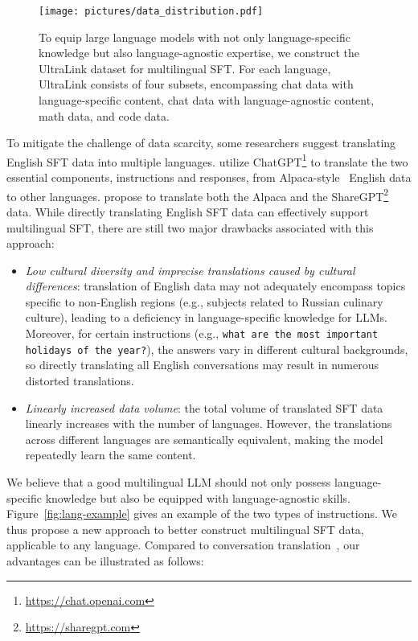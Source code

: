 \documentclass[11pt]{article}
\begin{document}
\begin{figure}[t]
    \centering
    \texttt{[image: pictures/data\_distribution.pdf]}
    \caption{To equip large language models with not only language-specific knowledge but also language-agnostic expertise, we construct the UltraLink dataset for multilingual SFT. For each language, UltraLink consists of four subsets, encompassing chat data with language-specific content, chat data with language-agnostic content, math data, and code data.}
    \label{fig:data_distribution}
\end{figure}

To mitigate the challenge of data scarcity, some researchers suggest translating English SFT data into multiple languages. \citet{okapi} utilize ChatGPT\footnote{\url{https://chat.openai.com}} to translate the two essential components, instructions and responses, from Alpaca-style~\cite{alpaca} English data to other languages. \citet{phoenix} propose to translate both the Alpaca and the ShareGPT\footnote{\url{https://sharegpt.com}} data. While directly translating English SFT data can effectively support multilingual SFT, there are still two major drawbacks associated with this approach:

\begin{itemize}
    \item {\em Low cultural diversity and imprecise translations caused by cultural differences}: translation of English data may not adequately encompass topics specific to non-English regions (e.g., subjects related to Russian culinary culture), leading to a deficiency in language-specific knowledge for LLMs.
    Moreover, for certain instructions (e.g., \texttt{what are the most important holidays of the year?}), the answers vary in different cultural backgrounds, so directly translating all English conversations may result in numerous distorted translations.
    \item {\em Linearly increased data volume}: the total volume of translated SFT data linearly increases with the number of languages. However, the translations across different languages are semantically equivalent, making the model repeatedly learn the same content.  
\end{itemize}

We believe that a good multilingual LLM should not only possess language-specific knowledge but also be equipped with language-agnostic skills. Figure~\ref{fig:lang-example} gives an example of the two types of instructions. We thus propose a new approach to better construct multilingual SFT data, applicable to any language. Compared to conversation translation~\cite{okapi,phoenix}, our advantages can be illustrated as follows:
\end{document}
